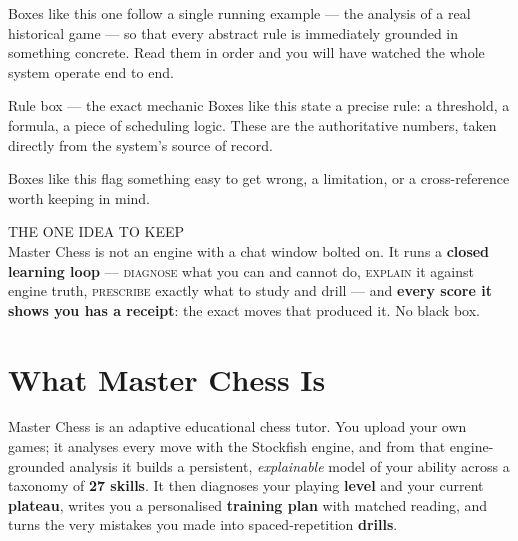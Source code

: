\documentclass[11pt]{article}
\begin{document}
\begin{playbox}
Boxes like this one follow a single running example — the analysis of a real
historical game — so that every abstract rule is immediately grounded in
something concrete. Read them in order and you will have watched the whole
system operate end to end.
\end{playbox}

\begin{rulebox}{Rule box — the exact mechanic}
Boxes like this state a precise rule: a threshold, a formula, a piece of
scheduling logic. These are the authoritative numbers, taken directly from the
system's source of record.
\end{rulebox}

\begin{notebox}[Note]
Boxes like this flag something easy to get wrong, a limitation, or a
cross-reference worth keeping in mind.
\end{notebox}

\vspace{4pt}
\begin{center}
\begin{tcolorbox}[enhanced, width=0.92\linewidth, colback=parchment,
  colframe=rulehair, boxrule=0.6pt, arc=2pt, left=14pt,right=14pt,top=8pt,bottom=8pt]
{\sffamily\footnotesize\color{walnutmid}\MakeUppercase{The one idea to keep}}\\[2pt]
Master Chess is not an engine with a chat window bolted on. It runs a
\textbf{closed learning loop} — \textsc{diagnose} what you can and cannot do,
\textsc{explain} it against engine truth, \textsc{prescribe} exactly what to
study and drill — and \textbf{every score it shows you has a receipt}: the exact
moves that produced it. No black box.
\end{tcolorbox}
\end{center}

\newpage
\tableofcontents
\newpage

\section{What Master Chess Is}

Master Chess is an adaptive educational chess tutor. You upload your own games;
it analyses every move with the Stockfish engine, and from that
engine-grounded analysis it builds a persistent, \emph{explainable} model of
your ability across a taxonomy of \textbf{27 skills}. It then diagnoses your
playing \textbf{level} and your current \textbf{plateau}, writes you a
personalised \textbf{training plan} with matched reading, and turns the very
mistakes you made into spaced-repetition \textbf{drills}.
\end{document}
